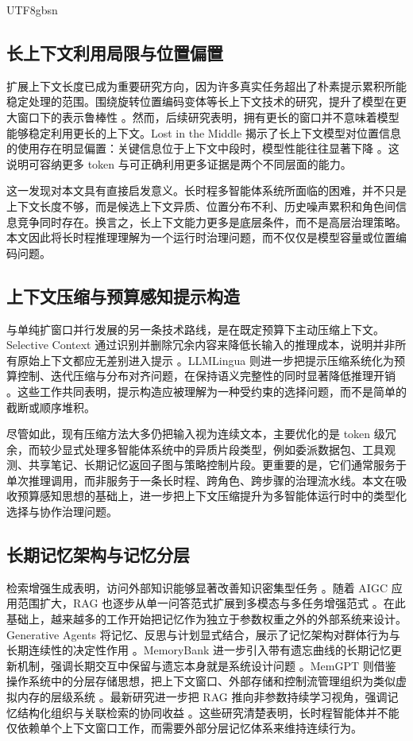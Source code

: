 \documentclass[a4paper,fleqn]{cas-sc}
\begin{document}
\begin{CJK*}{UTF8}{gbsn}
\subsection{长上下文利用局限与位置偏置}

扩展上下文长度已成为重要研究方向，因为许多真实任务超出了朴素提示累积所能稳定处理的范围。围绕旋转位置编码变体等长上下文技术的研究，提升了模型在更大窗口下的表示鲁棒性 \citep{li2024sbarope}。然而，后续研究表明，拥有更长的窗口并不意味着模型能够稳定利用更长的上下文。Lost in the Middle 揭示了长上下文模型对位置信息的使用存在明显偏置：关键信息位于上下文中段时，模型性能往往显著下降 \citep{liu2024lostmiddle}。这说明可容纳更多 token 与可正确利用更多证据是两个不同层面的能力。

这一发现对本文具有直接启发意义。长时程多智能体系统所面临的困难，并不只是上下文长度不够，而是候选上下文异质、位置分布不利、历史噪声累积和角色间信息竞争同时存在。换言之，长上下文能力更多是底层条件，而不是高层治理策略。本文因此将长时程推理理解为一个运行时治理问题，而不仅仅是模型容量或位置编码问题。

\subsection{上下文压缩与预算感知提示构造}

与单纯扩窗口并行发展的另一条技术路线，是在既定预算下主动压缩上下文。Selective Context 通过识别并删除冗余内容来降低长输入的推理成本，说明并非所有原始上下文都应无差别进入提示 \citep{li2023selectivecontext}。LLMLingua 则进一步把提示压缩系统化为预算控制、迭代压缩与分布对齐问题，在保持语义完整性的同时显著降低推理开销 \citep{jiang2023llmlingua}。这些工作共同表明，提示构造应被理解为一种受约束的选择问题，而不是简单的截断或顺序堆积。

尽管如此，现有压缩方法大多仍把输入视为连续文本，主要优化的是 token 级冗余，而较少显式处理多智能体系统中的异质片段类型，例如委派数据包、工具观测、共享笔记、长期记忆返回子图与策略控制片段。更重要的是，它们通常服务于单次推理调用，而非服务于一条长时程、跨角色、跨步骤的治理流水线。本文在吸收预算感知思想的基础上，进一步把上下文压缩提升为多智能体运行时中的类型化选择与协作治理问题。

\subsection{长期记忆架构与记忆分层}

检索增强生成表明，访问外部知识能够显著改善知识密集型任务 \citep{lewis2020rag}。随着 AIGC 应用范围扩大，RAG 也逐步从单一问答范式扩展到多模态与多任务增强范式 \citep{zhao2026ragaigc}。在此基础上，越来越多的工作开始把记忆作为独立于参数权重之外的外部系统来设计。Generative Agents 将记忆、反思与计划显式结合，展示了记忆架构对群体行为与长期连续性的决定性作用 \citep{park2023generative}。MemoryBank 进一步引入带有遗忘曲线的长期记忆更新机制，强调长期交互中保留与遗忘本身就是系统设计问题 \citep{zhong2023memorybank}。MemGPT 则借鉴操作系统中的分层存储思想，把上下文窗口、外部存储和控制流管理组织为类似虚拟内存的层级系统 \citep{packer2023memgpt}。最新研究进一步把 RAG 推向非参数持续学习视角，强调记忆结构化组织与关联检索的协同收益 \citep{gutierrez2025ragtomemory}。这些研究清楚表明，长时程智能体并不能仅依赖单个上下文窗口工作，而需要外部分层记忆体系来维持连续行为。


\end{CJK*}
\end{document}
